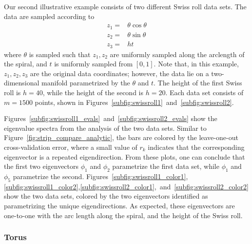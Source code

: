 \documentclass[3p]{elsarticle}
\begin{document}
Our second illustrative example consists of two different Swiss roll data sets.
%
The data are sampled according to
\begin{equation}
\begin{aligned}
z_1 =& \theta \cos \theta \\
z_2 =& \theta \sin \theta \\
z_3 =& h t
\end{aligned}
\end{equation}
%
where $\theta$ is sampled such that $z_1, z_2$ are uniformly sampled along the arclength of the spiral, and $t$ is uniformly sampled from $[0,1]$.
%
Note that, in this example, $z_1, z_2, z_3$ are the original data coordinates; however, the data lie on a
two-dimensional manifold parametrized by the $\theta$ and $t$.
%
The height of the first Swiss roll is $h = 40$, while the height of the second is $h = 20$.
%
Each data set consists of $m=1500$ points, shown in Figures~\ref{subfig:swissroll1}~and~\ref{subfig:swissroll2}.
%

Figures~\ref{subfig:swissroll1_evals}~and~\ref{subfig:swissroll2_evals} show the eigenvalue spectra from the analysis of the two data sets.
%
Similar to Figure~\ref{fig:strip_compare_analytic}, the bars are colored by the leave-one-out cross-validation error, 
where a small value of $r_k$ indicates that the corresponding eigenvector is a repeated eigendirection.
%
From these plots, one can conclude that the first two eigenvectors $\phi_1$ and $\phi_2$ parametrize the first data set, 
while $\phi_1$ and $\phi_5$ parametrize the second.
%
Figures~\ref{subfig:swissroll1_color1},\ref{subfig:swissroll1_color2},\ref{subfig:swissroll2_color1},~and~\ref{subfig:swissroll2_color2} 
show the two data sets, colored by the two eigenvectors identified as parametrizing the unique eigendirections.
%
As expected, these eigenvectors are one-to-one with the arc length along the spiral, and the height of the Swiss roll.

\subsubsection{Torus}
\end{document}
